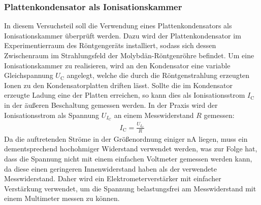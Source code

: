 \documentclass[11pt, a4paper]{article}
\numberwithin{equation}{section}
\begin{document}
\subsubsection{Plattenkondensator als Ionisationskammer}
In diesem Versuchsteil soll die Verwendung eines Plattenkondensators als Ionisationskammer überprüft werden.
Dazu wird der Plattenkondensator im Experimentierraum des Röntgengeräts installiert, sodass sich dessen Zwischenraum im Strahlungsfeld der Molybdän-Röntgenröhre befindet.
Um eine Ionisationskammer zu realisieren, wird an den Kondensator eine variable Gleichspannung $U_\mathrm{C}$ angelegt, welche die durch die Röntgenstrahlung erzeugten Ionen zu den Kondensatorplatten driften lässt.
Sollte die im Kondensator erzeugte Ladung eine der Platten erreichen, so kann dies als Ionisationsstrom $I_\mathrm{C}$ in der äußeren Beschaltung gemessen werden.
In der Praxis wird der Ionisationsstrom als Spannung $U_{I_\mathrm{C}}$ an einem Messwiderstand $R$ gemessen:
\begin{align}
	I_\mathrm{C} = \frac{U_{I_\mathrm{C}}}{R}
	\label{eq:ohm_ionisationsstrom}
\end{align}
Da die auftretenden Ströme in der Größenordnung einiger \si{nA} liegen, muss ein dementsprechend hochohmiger Widerstand verwendet werden, was zur Folge hat, dass die Spannung nicht mit einem einfachen Voltmeter gemessen werden kann, da diese einen geringeren Innenwiderstand haben als der verwendete Messwiderstand.
Daher wird ein Elektrometerverstärker mit einfacher Verstärkung verwendet, um die Spannung belastungsfrei am Messwiderstand mit einem Multimeter messen zu können.
\end{document}
